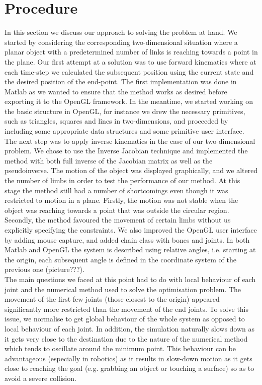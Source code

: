 \documentclass[paper=a4, fontsize=11pt]{scrartcl} %
\numberwithin{equation}{section} %
\numberwithin{figure}{section} %
\numberwithin{table}{section} %
\begin{document}

\section{Procedure}
In this section we discuss our approach to solving the problem at hand. We started by considering the corresponding two-dimensional situation where a planar object with a predetermined number of links is reaching towards a point in the plane. Our first attempt at a solution was to use forward kinematics where at each time-step we calculated the subsequent position using the current state and the desired position of the end-point. The first implementation was done in Matlab as we wanted to ensure that the method works as desired before exporting it to the OpenGL framework. In the meantime, we started working on the basic structure in OpenGL, for instance we drew the necessary primitives, such as triangles, squares and lines in two-dimensions, and proceeded by including some appropriate data structures and some primitive user interface. \\

The next step was to apply inverse kinematics in the case of our two-dimensional problem. We chose to use the Inverse Jacobian technique and implemented the method with both full inverse of the Jacobian matrix as well as the pseudoinverse. The motion of the object was displayed graphically, and we altered the number of limbs in order to test the performance of our method. At this stage the method still had a number of shortcomings even though it was restricted to motion in a plane. Firstly, the motion was not stable when the object was reaching towards a point that was outside the circular region. Secondly, the method favoured the movement of certain limbs without us explicitly specifying the constraints. We also improved the OpenGL user interface by adding mouse capture, and added chain class with bones and joints. In both Matlab and OpenGL the system is described using relative angles, i.e. starting at the origin, each subsequent angle is defined in the coordinate system of the previous one (picture???). \\

The main questions we faced at this point had to do with local behaviour of each joint and the numerical method used to solve the optimisation problem. The movement of the first few joints (those closest to the origin) appeared significantly more restricted than the movement of the end joints. To solve this issue, we normalise to get global behaviour of the whole system as opposed to local behaviour of each joint. In addition, the simulation naturally slows down as it gets very close to the destination due to the nature of the numerical method which tends to oscillate around the minimum point. This behaviour can be advantageous (especially in robotics) as it results in slow-down motion as it gets close to reaching the goal (e.g. grabbing an object or touching a surface) so as to avoid a severe collision. \\
\end{document}
